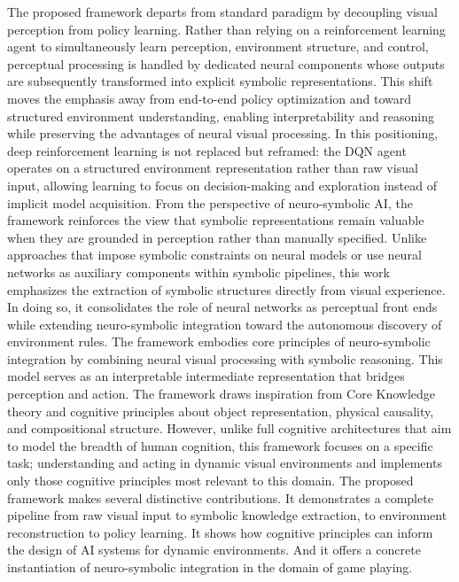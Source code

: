 \documentclass[12pt,a4paper]{report}
\begin{document}
The proposed framework departs from standard paradigm by decoupling visual perception from policy learning. Rather than relying on a reinforcement learning agent to simultaneously learn perception, environment structure, and control, perceptual processing is handled by dedicated neural components whose outputs are subsequently transformed into explicit symbolic representations. This shift moves the emphasis away from end-to-end policy optimization and toward structured environment understanding, enabling interpretability and reasoning while preserving the advantages of neural visual processing.
In this positioning, deep reinforcement learning is not replaced but reframed: the DQN agent operates on a structured environment representation rather than raw visual input, allowing learning to focus on decision-making and exploration instead of implicit model acquisition.
From the perspective of neuro-symbolic AI, the framework reinforces the view that symbolic representations remain valuable when they are grounded in perception rather than manually specified. Unlike approaches that impose symbolic constraints on neural models or use neural networks as auxiliary components within symbolic pipelines, this work emphasizes the extraction of symbolic structures directly from visual experience. In doing so, it consolidates the role of neural networks as perceptual front ends while extending neuro-symbolic integration toward the autonomous discovery of environment rules.
The framework embodies core principles of neuro-symbolic integration by combining neural visual processing with symbolic reasoning. This model serves as an interpretable intermediate representation that bridges perception and action.
The framework draws inspiration from Core Knowledge theory and cognitive principles about object representation, physical causality, and compositional structure. However, unlike full cognitive architectures that aim to model the breadth of human cognition, this framework focuses on a specific task; understanding and acting in dynamic visual environments and implements only those cognitive principles most relevant to this domain.
The proposed framework makes several distinctive contributions. It demonstrates a complete pipeline from raw visual input to symbolic knowledge extraction, to environment reconstruction to policy learning. It shows how cognitive principles can inform the design of AI systems for dynamic environments. And it offers a concrete instantiation of neuro-symbolic integration in the domain of game playing.
\end{document}
